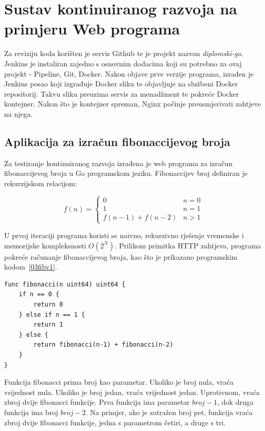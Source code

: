 \chapter{Sustav kontinuiranog razvoja na primjeru Web programa}
Za reviziju koda korišten je servis Github te je projekt nazvan \textit{diplomski-go}. Jenkins je
instaliran zajedno s osnovnim dodacima koji su potrebno za ovaj projekt - Pipeline, Git, Docker.
Nakon objave prve verzije programa, izrađen je Jenkins posao koji izgrađuje Docker sliku te
objavljuje na službeni Docker repositorij. Takvu sliku preuzima servis za menadžment te pokreće
Docker kontejner. Nakon što je kontejner spreman, Nginx počinje preusmjerivati zahtjeve na njega.

\section{Aplikacija za izračun fibonaccijevog broja}
Za testiranje kontinuiranog razvoja izrađena je web programa za izračun fibonaccijevog broja u Go
programskom jeziku. Fibonaccijev broj definiran je rekurzijskom relacijom:

\begin{equation*}
    f(n) = \begin{cases}
               0               & n = 0\\
               1               & n = 1\\
               f(n-1) + f(n-2) & n > 1
           \end{cases}
\end{equation*}

U prvoj iteraciji programa koristi se naivno, rekurzivno rješenje vremenske i memorijske
kompleksnosti $O(2^N)$. Prilikom primitka HTTP zahtjeva, programa pokreće računanje fibonaccijevog
broja, kao što je prikazano programskim kodom~\ref{03fibv1}.

\begin{lstlisting}[float=h]
func fibonacci(n uint64) uint64 {
	if n == 0 {
		return 0
	} else if n == 1 {
		return 1
	} else {
		return fibonacci(n-1) + fibonacci(n-2)
	}
}
\end{lstlisting}

Funkcija fibonacci prima broj kao parametar. Ukoliko je broj nula, vraća vrijednost nula.
Ukoliko je broj jedan, vraća vrijednost jedan. Uprotivnom, vraća zbroj dvije fibonacci funkcije.
Prva funkcija ima parametar $broj-1$, dok druga funkcija ima broj $broj-2$. Na primjer, ako je
zatražen broj pet, funkcija vraća zbroj dvije fibonacci funkcije, jedna s parametrom četiri, a druge
s tri.


